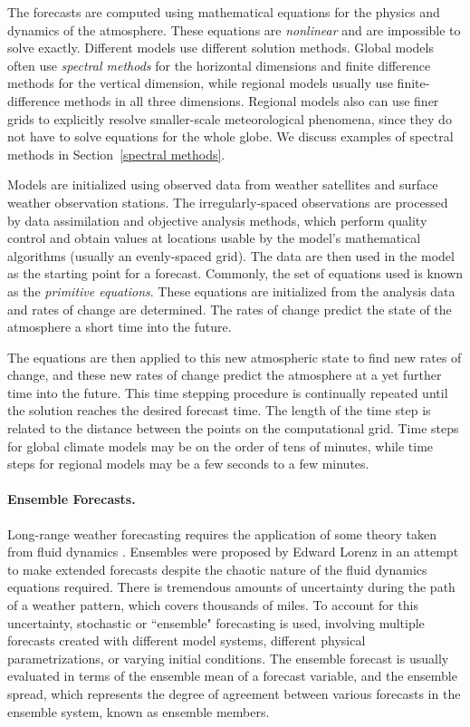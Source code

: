 The forecasts are computed using mathematical equations for the physics and dynamics of the atmosphere. These equations are \emph{nonlinear} and are impossible to solve exactly.
 Different models use different solution methods. Global models often use \emph{spectral methods} for the horizontal dimensions and finite difference methods for the vertical dimension, while regional models usually use finite-difference methods in all three dimensions. Regional models also can use finer grids to explicitly resolve smaller-scale meteorological phenomena, since they do not have to solve equations for the whole globe. We discuss examples of spectral methods in Section~\ref{spectral methods}.

Models are initialized using observed data from weather satellites and surface weather observation stations. The irregularly-spaced observations are processed by data assimilation and objective analysis methods, which perform quality control and obtain values at locations usable by the model's mathematical algorithms (usually an evenly-spaced grid). The data are then used in the model as the starting point for a forecast. Commonly, the set of equations used is known as the \emph{primitive equations}. These equations are initialized from the analysis data and rates of change are determined. The rates of change predict the state of the atmosphere a short time into the future.

The equations are then applied to this new atmospheric state to find new rates of change, and these new rates of change predict the atmosphere at a yet further time into the future.
This time stepping procedure is continually repeated until the solution reaches the desired forecast time. The length of the time step is related to the distance between the points on the computational grid. Time steps for global climate models may be on the order of tens of minutes, while time steps for regional models may be a few seconds to a few minutes.

\paragraph{Ensemble Forecasts.} Long-range weather forecasting requires the application of some theory taken from fluid dynamics \cite{lorenz1969pfp}. Ensembles were proposed by Edward Lorenz in an attempt to make extended forecasts despite the chaotic nature of the fluid dynamics equations required. There is tremendous amounts of uncertainty during the path of a weather pattern, which covers thousands of miles. To account for this uncertainty, stochastic or ``ensemble" forecasting is used, involving multiple forecasts created with different model systems, different physical parametrizations, or varying initial conditions. The ensemble forecast is usually evaluated in terms of the ensemble mean of a forecast variable, and the ensemble spread, which represents the degree of agreement between various forecasts in the ensemble system, known as ensemble members.

